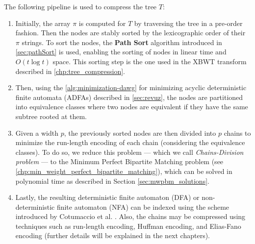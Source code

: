 The following pipeline is used to compress the tree $T$:
\begin{enumerate}
    \item Initially, the array $\pi$ is computed for $T$ by traversing the tree in a pre-order fashion. Then the nodes are stably sorted by the lexicographic order of their $\pi$ strings. To sort the nodes, the \textbf{Path Sort} algorithm introduced in \cref{sec:pathSort} is used, enabling the sorting of nodes in linear time and $O(t \log t)$ space. This sorting step is the one used in the XBWT transform described in \cref{chp:tree_compression}.
    \item Then, using the \cref{alg:minimization-dawg} for minimizing acyclic deterministic finite automata (ADFAs) described in \cref{sec:revuz}, the nodes are partitioned into equivalence classes where two nodes are equivalent if they have the same subtree rooted at them.
    \item Given a width $p$, the previously sorted nodes are then divided into $p$ chains to minimize the run-length encoding of each chain (considering the equivalence classes). To do so, we reduce this problem --- which we call \emph{Chains-Division problem} --- to the Minimum Perfect Bipartite Matching problem (see \cref{chp:min_weight_perfect_bipartite_matching}), which can be solved in polynomial time as described in Section \cref{sec:mwpbm_solutions}.
    \item Lastly, the resulting deterministic finite automaton (DFA) or non-deterministic finite automaton (NFA) can be indexed using the scheme introduced by Cotumaccio et al. \cite{cotumaccio2023co}. Also, the chains may be compressed using techniques such as run-length encoding, Huffman encoding, and Elias-Fano encoding (further details will be explained in the next chapters).
\end{enumerate}